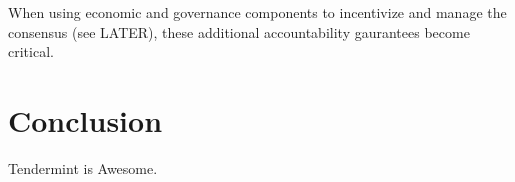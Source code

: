 When using economic and governance components to incentivize and manage the consensus (see LATER), 
these additional accountability gaurantees become critical.

\section{Conclusion}

Tendermint is Awesome.



